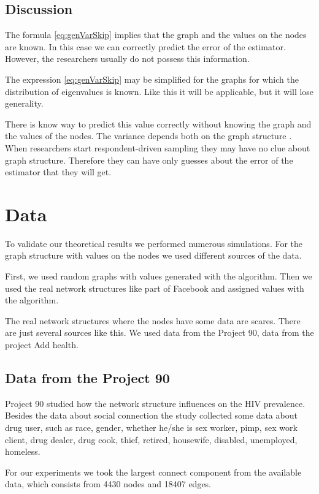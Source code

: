\documentclass[12pt]{report}
\begin{document}
\subsection{Discussion}

The formula \ref{eq:genVarSkip} implies that the graph and the values on the nodes are known. In this case we can correctly predict the error of the estimator. However, the researchers usually do not possess this information.

The expression \ref{eq:genVarSkip} may be simplified for the graphs for which the distribution of eigenvalues is known. Like this it will be applicable, but it will lose generality.

There is know way to predict this value correctly without knowing the graph and the values of the nodes. The variance depends both on the graph structure . When researchers start respondent-driven sampling they may have no clue about graph structure. Therefore they can have only guesses about the error of the estimator that they will get.


\section{Data}

To validate our theoretical results we performed numerous simulations. For the graph structure with values on the nodes we used different sources of the data. 

First, we used random graphs with values generated with the algorithm. 
Then we used the real network structures like part of Facebook \cite{Facebook}  and assigned values with the algorithm.

The real network structures where the nodes have some data are scares. There are just several sources like this. We used data from the Project 90\cite{Project90}, data from the project Add health\cite{Addhealth}. 

\subsection{Data from the Project 90}
Project 90 \cite{Project90} studied how the network structure influences on the HIV prevalence. Besides the data about social connection the study collected some data about drug user, such as race, gender, whether he/she is sex worker, pimp, sex work client, drug dealer, drug cook, thief, retired, housewife, disabled, unemployed, homeless.


For our experiments we took the largest connect component from the available data, which consists from 4430 nodes and 18407 edges.
\end{document}
